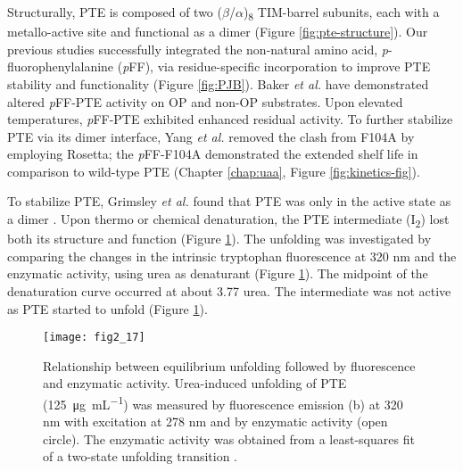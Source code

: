 \begin{refsection}
Structurally, PTE is composed of two ($\beta$/$\alpha$)\textsubscript{8}
TIM-barrel subunits, each with a metallo-active site and functional as a dimer
(Figure \ref{fig:pte-structure}). Our previous studies successfully integrated the
non-natural amino acid, \emph{p}-fluorophenylalanine (\emph{p}FF), via
residue-specific incorporation to improve PTE stability and functionality
\cite{Baker2011b,Yang2014a} (Figure \ref{fig:PJB}). Baker \emph{et al.} have
demonstrated altered \emph{p}FF-PTE activity on OP and non-OP substrates.
Upon elevated temperatures, \emph{p}FF-PTE exhibited enhanced residual
activity. To further stabilize PTE via its dimer interface, Yang \emph{et al.}
removed the clash from F104A by employing Rosetta; the \emph{p}FF-F104A
demonstrated the extended shelf life in comparison to wild-type PTE
\cite{Yang2014a} (Chapter \ref{chap:uaa}, Figure \ref{fig:kinetics-fig}).

To stabilize PTE, Grimsley \emph{et al.} found that PTE was only in the active
state as a dimer \cite{Grimsley1997b}. Upon thermo or chemical denaturation,
the PTE intermediate (I\textsubscript{2}) lost both its structure and function
\cite{Rochu2002b,Grimsley1997b} (Figure \ref{fig:pte-unfold}). The unfolding
was investigated by comparing the changes in the intrinsic tryptophan
fluorescence at 320 nm and the enzymatic activity, using urea as denaturant
(Figure \ref{fig:pte-unfold}). The midpoint of the denaturation curve occurred
at about \SI{3.77}{\Molar} urea. The intermediate was not active as PTE started
to unfold (Figure \ref{fig:pte-unfold}).
\begin{figure}[htbp] \centering \texttt{[image: fig2\_17]}
    \caption[Relationship between equilibrium unfolding followed by
    fluorescence and enzymatic activity. Urea-induced unfolding of PTE
(\SI{125}{\micro\gram\per\mL}) was measured by fluorescence emission at 320
nm with excitation at 278 nm and by enzymatic activity (open circle). The
enzymatic activity was obtained from a least-squares fit of a two-state
unfolding transition.]{Relationship between equilibrium unfolding followed by
    fluorescence and enzymatic activity. Urea-induced unfolding of PTE
    (\SI{125}{\micro\gram\per\mL}) was measured by fluorescence emission (b) at
    320 nm with excitation at 278 nm and by enzymatic activity (open circle).
    The enzymatic activity was obtained from a least-squares fit of a two-state
    unfolding transition \cite{Grimsley1997b}.}
    \label{fig:pte-unfold}
\end{figure}


\end{refsection}
